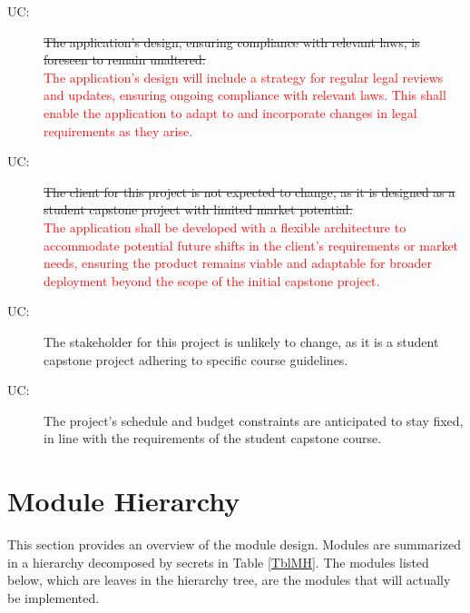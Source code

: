 \documentclass[12pt, titlepage]{article}
\newcommand{\rt}[1]{\textcolor{red}{#1}}
\newcounter{ucnum}
\newcommand{\uctheucnum}{UC\theucnum}
\begin{document}
\begin{description}
\item[ \uctheucnum:] \sout{The application's design, ensuring compliance with relevant laws, is foreseen to remain unaltered.}\\
    \rt{The application’s design will include a strategy for regular legal reviews and updates, ensuring ongoing compliance with relevant laws. This shall enable the application to adapt to and incorporate changes in legal requirements as they arise.}

\item[ \uctheucnum:] \sout{The client for this project is not expected to change, as it is designed as a student capstone project with limited market potential.}\\
    \rt{The application shall be developed with a flexible architecture to accommodate potential future shifts in the client's requirements or market needs, ensuring the product remains viable and adaptable for broader deployment beyond the scope of the initial capstone project.}

\item[ \uctheucnum:] The stakeholder for this project is unlikely to change, as it is a student capstone project adhering to specific course guidelines.

\item[ \uctheucnum:] The project's schedule and budget constraints are anticipated to stay fixed, in line with the requirements of the student capstone course.
\end{description}

\section{Module Hierarchy} \label{SecMH}

This section provides an overview of the module design. Modules are summarized
in a hierarchy decomposed by secrets in Table \ref{TblMH}. The modules listed
below, which are leaves in the hierarchy tree, are the modules that will
actually be implemented.
\end{document}
